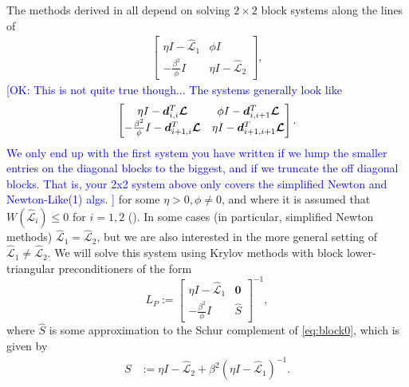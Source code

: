 \documentclass[review]{siamart}
\newcommand{\OK}[1]{\textcolor{blue}{[OK: #1]}}
\begin{document}
The methods derived in  all depend on
solving $2\times 2$ block systems along the lines of
%
\begin{align}\label{eq:block0}
\begin{bmatrix} \eta I - \widehat{\mathcal{L}}_1 & \phi I\\
-\frac{\beta^2}{\phi} I & \eta I - \widehat{\mathcal{L}}_2\end{bmatrix},
\end{align}
%
\OK{This is not quite true though... The systems generally look like
\begin{align}
\begin{bmatrix} \eta I - \bm{d}_{i,i}^T \bm{{\cal L}} & \phi I - \bm{d}_{i,i+1}^T \bm{{\cal L}}\\
-\frac{\beta^2}{\phi} I - \bm{d}_{i+1,i}^T \bm{{\cal L}} & \eta I -  \bm{d}_{i+1,i+1}^T \bm{{\cal L}}\end{bmatrix}.
\end{align}
We only end up with the first system you have written if we lump the smaller entries on the diagonal blocks to the biggest, and if we truncate the off diagonal blocks. That is, your 2x2 system above only covers the simplified Newton and Newton-Like(1) algs.
}
%
for some $\eta > 0, \phi \neq 0$, and where it is assumed that
$W(\widehat{\mathcal{L}}_i) \leq 0$ for $i=1,2$ (). In some
cases (in particular, simplified Newton methods) $\widehat{\mathcal{L}}_1 =
\widehat{\mathcal{L}}_2$, but we are also interested in the more general
setting of $\widehat{\mathcal{L}}_1 \neq \widehat{\mathcal{L}}_2$. We will solve
this system using Krylov methods with block lower-triangular preconditioners
of the form
%
\begin{equation}\label{eq:Lprec}
L_P := \begin{bmatrix} \eta I - \widehat{\mathcal{L}}_1 & \mathbf{0} \\ -\frac{\beta^2}{\phi} I
	& \widehat{S}\end{bmatrix}^{-1},
\end{equation}
%
where $\widehat{S}$ is some approximation to the Schur complement of \eqref{eq:block0},
which is given by
%
\begin{align}\label{eq:Schur}
S & := \eta I - \widehat{\mathcal{L}}_2 + \beta^2 (\eta I - \widehat{\mathcal{L}}_1)^{-1}.
\end{align}
%
\end{document}
